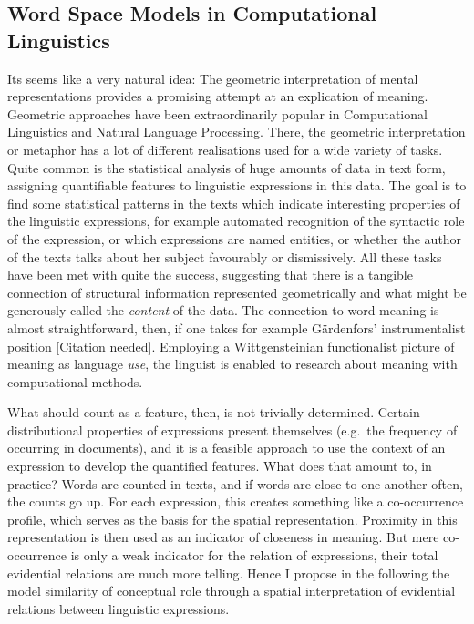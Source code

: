 \documentclass[11pt, a4paper]{scrartcl}
\renewcommand{\i}[1]{\emph{#1}}
\begin{document}
\subsection{Word Space Models in Computational Linguistics}
Its seems like a very natural idea: The geometric interpretation of mental representations provides a promising attempt at an explication of meaning. Geometric approaches have been extraordinarily popular in Computational Linguistics and Natural Language Processing. There, the geometric interpretation or metaphor has a lot of different realisations used for a wide variety of tasks. Quite common is the statistical analysis of huge amounts of data in text form, assigning quantifiable features to linguistic expressions in this data. The goal is to find some statistical patterns in the texts which indicate interesting properties of the linguistic expressions, for example automated recognition of the syntactic role of the expression, or which expressions are named entities, or whether the author of the texts talks about her subject favourably or dismissively. All these tasks have been met with quite the success, suggesting that there is a tangible connection of structural information represented geometrically and what might be generously called the \i{content} of the data. The connection to word meaning is almost straightforward, then, if one takes for example Gärdenfors' instrumentalist position [Citation needed]. Employing a Wittgensteinian functionalist picture of meaning as language \i{use}, the linguist is enabled to research about meaning with computational methods.

What should count as a feature, then, is not trivially determined. Certain distributional properties of expressions present themselves (e.g.\ the frequency of occurring in documents), and it is a feasible approach to use the context of an expression to develop the quantified features. What does that amount to, in practice? Words are counted in texts, and if words are close to one another often, the counts go up. For each expression, this creates something like a co-occurrence profile, which serves as the basis for the spatial representation. Proximity in this representation is then used as an indicator of closeness in meaning. But mere co-occurrence is only a weak indicator for the relation of expressions, their total evidential relations are much more telling. Hence I propose in the following the model similarity of conceptual role through a spatial interpretation of evidential relations between linguistic expressions. 
\end{document}
